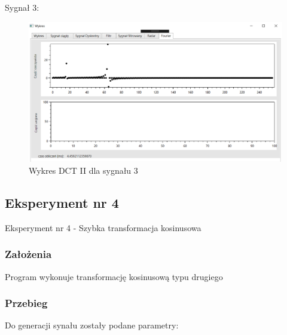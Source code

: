 \documentclass[12pt]{article}
\begin{document}
\newpage
Sygnał 3:
\begin{figure}[h!]
 \centering
 \includegraphics[width=12.3cm]{s18DCT2.PNG}
 \vspace{-0.3cm}
 \caption{Wykres DCT II dla sygnału 3}
 \label{Wykres dla wynikw eksperymentu pierwszego}
\end{figure}


\subsection{Eksperyment nr 4}

Eksperyment nr 4  - Szybka transformacja kosinusowa
\subsubsection{Założenia}
Program wykonuje transformację kosinusową typu drugiego

\subsubsection{Przebieg}
Do generacji synału zostały podane parametry:
\end{document}
